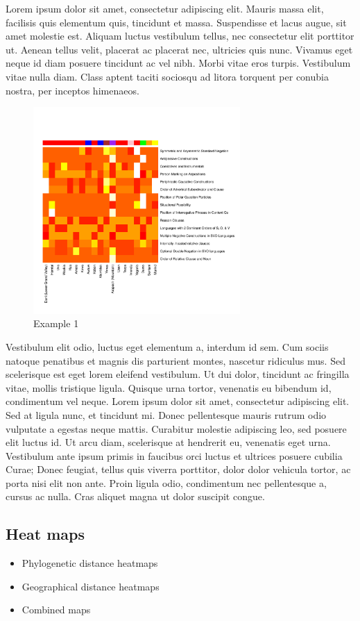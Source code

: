\documentclass[11pt]{article}
\begin{document}
Lorem ipsum dolor sit amet, consectetur adipiscing elit. Mauris massa elit, facilisis quis elementum quis, tincidunt et massa. Suspendisse et lacus augue, sit amet molestie est. Aliquam luctus vestibulum tellus, nec consectetur elit porttitor ut. Aenean tellus velit, placerat ac placerat nec, ultricies quis nunc. Vivamus eget neque id diam posuere tincidunt ac vel nibh. Morbi vitae eros turpis. Vestibulum vitae nulla diam. Class aptent taciti sociosqu ad litora torquent per conubia nostra, per inceptos himenaeos.
\begin{figure}[h]
\centering
\includegraphics[width=3.1in]
{graph2.pdf} 
\caption{Example 1} 
\label{fig:sparse} 
\end{figure}
Vestibulum elit odio, luctus eget elementum a, interdum id sem. Cum sociis natoque penatibus et magnis dis parturient montes, nascetur ridiculus mus. Sed scelerisque est eget lorem eleifend vestibulum. Ut dui dolor, tincidunt ac fringilla vitae, mollis tristique ligula. Quisque urna tortor, venenatis eu bibendum id, condimentum vel neque. Lorem ipsum dolor sit amet, consectetur adipiscing elit. Sed at ligula nunc, et tincidunt mi. Donec pellentesque mauris rutrum odio vulputate a egestas neque mattis. Curabitur molestie adipiscing leo, sed posuere elit luctus id. Ut arcu diam, scelerisque at hendrerit eu, venenatis eget urna. Vestibulum ante ipsum primis in faucibus orci luctus et ultrices posuere cubilia Curae; Donec feugiat, tellus quis viverra porttitor, dolor dolor vehicula tortor, ac porta nisi elit non ante. Proin ligula odio, condimentum nec pellentesque a, cursus ac nulla. Cras aliquet magna ut dolor suscipit congue.

\subsection{Heat maps}
\begin{itemize}
\item Phylogenetic distance heatmaps
\item Geographical distance heatmaps
\item Combined maps
\end{itemize}
\end{document}
